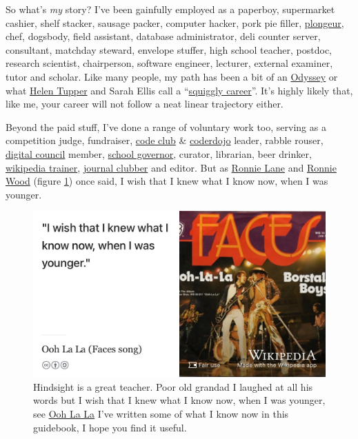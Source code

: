 \documentclass[
]{book}
\begin{document}
So what's \emph{my} story? I've been gainfully employed as a paperboy, supermarket cashier, shelf stacker, sausage packer, computer hacker, pork pie filler, \href{https://en.wikipedia.org/wiki/Plongeur}{plongeur}, chef, dogsbody, field assistant, database administrator, deli counter server, consultant, matchday steward, envelope stuffer, high school teacher, postdoc, research scientist, chairperson, software engineer, lecturer, external examiner, tutor and scholar. Like many people, my path has been a bit of an \href{https://en.wikipedia.org/wiki/Odyssey}{Odyssey} or what \href{https://twitter.com/HelenTupper}{Helen Tupper} and Sarah Ellis call a ``\href{https://www.amazingif.com/books/}{squiggly career}''. \citep{squigglybook} It's highly likely that, like me, your career will not follow a neat linear trajectory either. \citep{squigglytalk}

Beyond the paid stuff, I've done a range of voluntary work too, serving as a competition judge, fundraiser, \href{https://codeclub.org}{code club} \& \href{https://coderdojo.com}{coderdojo} leader, rabble rouser, \href{https://www.manchesterdigital.com/}{digital council} member, \href{https://governorsforschools.org.uk/}{school governor}, curator, librarian, beer drinker, \href{https://wiki-loves-scientists.org.uk/}{wikipedia trainer}, \href{https://sigcse.cs.manchester.ac.uk/}{journal clubber} and editor. But as \href{https://en.wikipedia.org/wiki/Ronnie_Lane}{Ronnie Lane} and \href{https://en.wikipedia.org/wiki/Ronnie_Wood}{Ronnie Wood} (figure \ref{fig:faces-fig}) once said, I wish that I knew what I know now, when I was younger.

\begin{figure}

{\centering \includegraphics[width=0.99\linewidth]{images/faces} 

}

\caption{Hindsight is a great teacher. Poor old grandad I laughed at all his words but I wish that I knew what I know now, when I was younger, see \href{https://en.wikipedia.org/wiki/Ooh_La_La_(Faces_song)}{Ooh La La} \citep{faces} I've written some of what I know now in this guidebook, I hope you find it useful.}\label{fig:faces-fig}
\end{figure}
\end{document}
